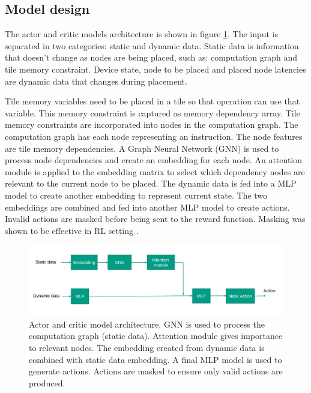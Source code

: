 \subsection{Model design}

The actor and critic models architecture is shown in figure \ref{fig:model}. 
The input is separated in two categories: static and dynamic data. 
Static data is information that doesn't change as nodes are being placed, such as: computation graph and tile memory constraint.
Device state, node to be placed and placed node latencies are dynamic data that changes during placement.

Tile memory variables need to be placed in a tile so that operation can use that variable. 
This memory constraint is captured as memory dependency array. 
Tile memory constraints are incorporated into nodes in the computation graph. 
The computation graph has each node representing an instruction. 
The node features are tile memory dependencies. 
A Graph Neural Network (GNN) is used to process node dependencies and create an embedding for each node. 
An attention module is applied to the embedding matrix to select which dependency nodes are relevant to the current node to be placed. The dynamic data is fed into a MLP model to 
create another embedding to represent current state. 
The two embeddings are combined and fed into another MLP model to 
create actions. 
Invalid actions are masked before being sent to the reward function. Masking was shown to be effective in RL setting \cite{Shengyi_mask}.

\begin{figure}[h]
  \centering
  \includegraphics[width=\linewidth]{fig/model.pdf}
  \caption{Actor and critic model architecture. GNN is used to process the computation graph (static data). 
  Attention module gives importance to relevant nodes. The embedding created from dynamic data is combined with static data embedding. 
  A final MLP model is used to generate actions. Actions are masked to ensure only valid actions are produced. }
  \label{fig:model}
\end{figure}


